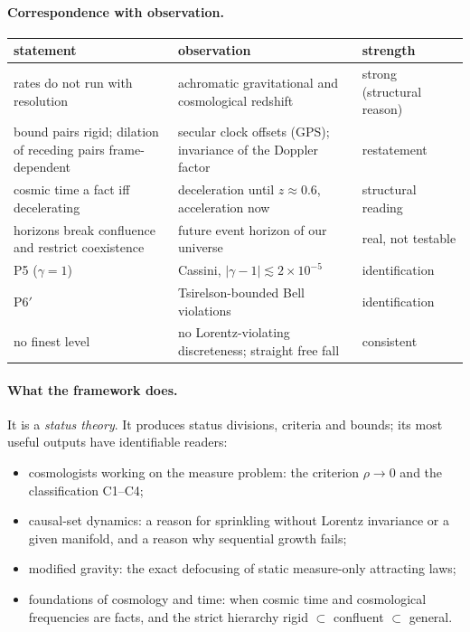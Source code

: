 \documentclass[11pt]{article}
\theoremstyle{definition}
\theoremstyle{remark}
\begin{document}
\paragraph{Correspondence with observation.}
\begin{center}\small
\begin{tabular}{p{}p{}p{}}\toprule
statement & observation & strength\\\midrule
rates do not run with resolution & achromatic gravitational and cosmological redshift & strong (structural reason)\\
bound pairs rigid; dilation of receding pairs frame-dependent & secular clock offsets (GPS); invariance of the Doppler factor & restatement\\
cosmic time a fact iff decelerating & deceleration until $z\approx0.6$, acceleration now & structural reading\\
horizons break confluence and restrict coexistence & future event horizon of our universe & real, not testable\\
P5 ($\gamma=1$) & Cassini, $|\gamma-1|\lesssim2\times10^{-5}$ \cite{cassini} & identification\\
P6$'$ & Tsirelson-bounded Bell violations & identification\\
no finest level & no Lorentz-violating discreteness; straight free fall & consistent\\\bottomrule
\end{tabular}
\end{center}

\paragraph{What the framework does.} It is a \emph{status theory}. It produces status divisions, criteria and bounds; its most useful outputs have identifiable readers:
\begin{itemize}[nosep]
\item cosmologists working on the measure problem: the criterion $\rho\to0$ and the classification C1--C4;
\item causal-set dynamics: a reason for sprinkling without Lorentz invariance or a given manifold, and a reason why sequential growth fails;
\item modified gravity: the exact defocusing of static measure-only attracting laws;
\item foundations of cosmology and time: when cosmic time and cosmological frequencies are facts, and the strict hierarchy rigid $\subset$ confluent $\subset$ general.
\end{itemize}
\end{document}
